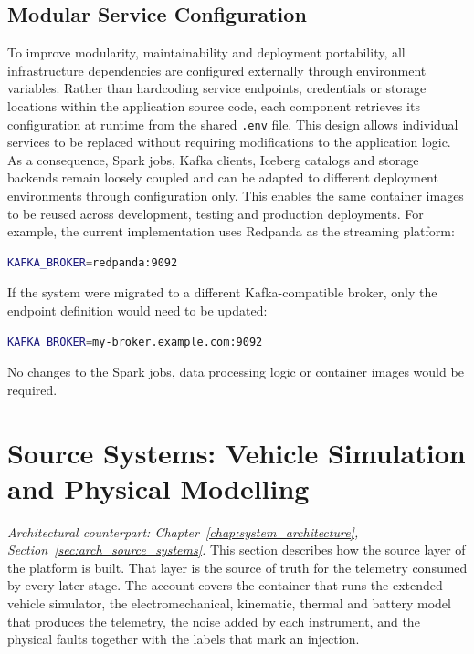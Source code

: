 \subsection{Modular Service Configuration}\label{subsec:modular-service-configuration}
To improve modularity, maintainability and deployment portability, all infrastructure dependencies are configured externally through environment variables.
Rather than hardcoding service endpoints, credentials or storage locations within the application source code, each component retrieves its configuration at runtime from the shared \texttt{.env} file. 
This design allows individual services to be replaced without requiring modifications to the application logic.
As a consequence, Spark jobs, Kafka clients, Iceberg catalogs and storage backends remain loosely coupled and can be adapted to different deployment environments through configuration only.  
This enables the same container images to be reused across development, testing and production deployments. 
For example, the current implementation uses Redpanda as the streaming platform: 

\begin{lstlisting}[language=bash] 
  KAFKA_BROKER=redpanda:9092 
\end{lstlisting} 

If the system were migrated to a different Kafka-compatible broker, only the endpoint definition would need to be updated: 

\begin{lstlisting}[language=bash] 
  KAFKA_BROKER=my-broker.example.com:9092 
\end{lstlisting} 

No changes to the Spark jobs, data processing logic or container images would be required.

\section{Source Systems: Vehicle Simulation and Physical Modelling}
\label{sec:source_system_simulation}
\label{sec:physical_modeling}
\textit{Architectural counterpart: Chapter~\ref{chap:system_architecture}, Section~\ref{sec:arch_source_systems}.}
This section describes how the source layer of the platform is built. That layer is the source of truth for the telemetry consumed by every later stage. The account covers the container that runs the extended vehicle simulator, the electromechanical, kinematic, thermal and battery model that produces the telemetry, the noise added by each instrument, and the physical faults together with the labels that mark an injection.

